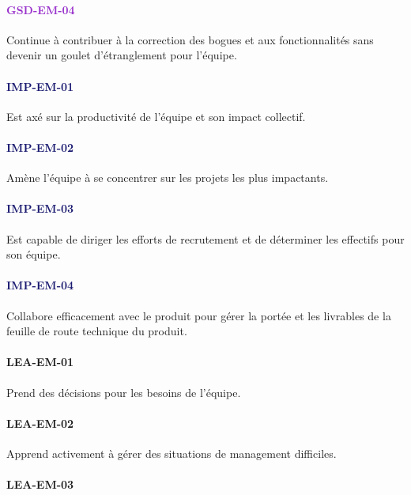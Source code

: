 \documentclass[a4paper, french, openany, 12pt]{book}
\newcommand\str[1]{\textcolor{DarkOrchid}{\textbf{\uppercase{gsd-{#1}}}}}
\newcommand\wis[1]{\textcolor{MidnightBlue}{\textbf{\uppercase{imp-{#1}}}}}
\newcommand\cha[1]{\textcolor{OliveGreen}{\textbf{\uppercase{lea-{#1}}}}}
\begin{document}
\begin{multicols}{2}
  \paragraph*{\str{em-04}}

  Continue à contribuer à la correction des bogues et aux fonctionnalités sans devenir un goulet d'étranglement pour 
  l'équipe.

  \paragraph*{\wis{em-01}}

  Est axé sur la productivité de l'équipe et son impact collectif.

  \paragraph*{\wis{em-02}}

  Amène l'équipe à se concentrer sur les projets les plus impactants.

  \paragraph*{\wis{em-03}}

  Est capable de diriger les efforts de recrutement et de déterminer les effectifs pour son équipe.
  
  \paragraph*{\wis{em-04}}

  Collabore efficacement avec le produit pour gérer la portée et les livrables de la feuille de route technique du 
  produit.

  \paragraph*{\cha{em-01}}

  Prend des décisions pour les besoins de l'équipe.
  
  \paragraph*{\cha{em-02}}

  Apprend activement à gérer des situations de management difficiles.

  \paragraph*{\cha{em-03}}
  

\end{multicols}
\end{document}
